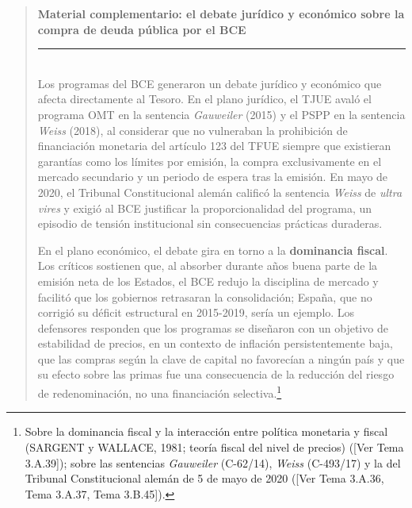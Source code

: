 \documentclass[10pt,a4paper]{article}
\newenvironment{specialblock}[1]{%
      \begin{quote} %
      \small %
      \noindent\textbf{#1}\\[-0.3em] %
      \rule{\linewidth}{0.4pt}\\[0.6em]}{
      \end{quote}}
\newcommand{\authorfont}[1]{{\fontfamily{EBGaramond-TLF}\selectfont #1}}
\begin{document}
\begin{specialblock}{\textbf{Material complementario:} el debate jurídico y económico sobre la compra de deuda pública por el BCE}
    Los programas del BCE generaron un debate jurídico y económico que afecta directamente al Tesoro. En el plano jurídico, el TJUE avaló el programa OMT en la sentencia \textit{Gauweiler} (2015) y el PSPP en la sentencia \textit{Weiss} (2018), al considerar que no vulneraban la prohibición de financiación monetaria del artículo 123 del TFUE siempre que existieran garantías como los límites por emisión, la compra exclusivamente en el mercado secundario y un periodo de espera tras la emisión. En mayo de 2020, el Tribunal Constitucional alemán calificó la sentencia \textit{Weiss} de \textit{ultra vires} y exigió al BCE justificar la proporcionalidad del programa, un episodio de tensión institucional sin consecuencias prácticas duraderas.

    En el plano económico, el debate gira en torno a la \textbf{dominancia fiscal}. Los críticos sostienen que, al absorber durante años buena parte de la emisión neta de los Estados, el BCE redujo la disciplina de mercado y facilitó que los gobiernos retrasaran la consolidación; España, que no corrigió su déficit estructural en 2015-2019, sería un ejemplo. Los defensores responden que los programas se diseñaron con un objetivo de estabilidad de precios, en un contexto de inflación persistentemente baja, que las compras según la clave de capital no favorecían a ningún país y que su efecto sobre las primas fue una consecuencia de la reducción del riesgo de redenominación, no una financiación selectiva.\footnote{%
        Sobre la dominancia fiscal y la interacción entre política monetaria y fiscal (SARGENT y WALLACE, 1981; teoría fiscal del nivel de precios) ([\authorfont{Ver Tema 3.A.39}]); sobre las sentencias \textit{Gauweiler} (C-62/14), \textit{Weiss} (C-493/17) y la del Tribunal Constitucional alemán de 5 de mayo de 2020 ([\authorfont{Ver Tema 3.A.36, Tema 3.A.37, Tema 3.B.45}]).
    }
\end{specialblock}
\end{document}

